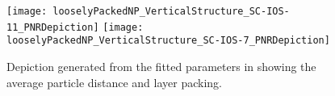 \documentclass[\main/dresen_thesis.tex]{subfiles}
\begin{document}
  \begin{figure}[tb]
    \centering
    \texttt{[image: looselyPackedNP\_VerticalStructure\_SC-IOS-11\_PNRDepiction]}
    \texttt{[image: looselyPackedNP\_VerticalStructure\_SC-IOS-7\_PNRDepiction]}
    \caption{\label{fig:looselyPackedNP:layer:xrrDepiction}Depiction generated from the fitted parameters in  showing the average particle distance and layer packing.}
  \end{figure}
\end{document}
